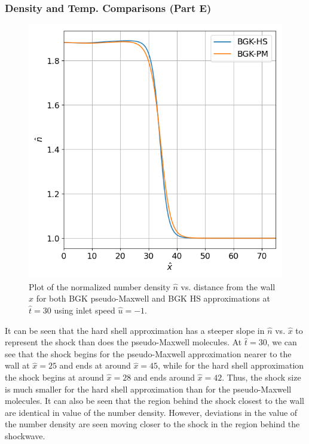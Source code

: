 \documentclass[a4paper]{article}
\begin{document}
\subsubsection{Density and Temp. Comparisons (Part E)}
\begin{figure}[hbt!]
    \centering
    \includegraphics[width=14cm]{plots/problem_e_n.png}
    \caption{\centering Plot of the normalized number density $\hat{n}$ vs. distance from the wall $\hat{x}$ for both BGK pseudo-Maxwell and BGK HS approximations at $\hat{t} = 30$ using inlet speed $\hat{u} = -1$.}
    \label{problem_e_n}
\end{figure}
It can be seen that the hard shell approximation has a steeper slope in $\hat{n}$ vs. $\hat{x}$ to represent the shock than does the pseudo-Maxwell molecules. At $\hat{t} = 30$, we can see that the shock begins for the pseudo-Maxwell approximation nearer to the wall at $\hat{x} = 25$ and ends at around $\hat{x} = 45$, while for the hard shell approximation the shock begins at around $\hat{x} = 28$ and ends around $\hat{x} = 42$. Thus, the shock size is much smaller for the hard shell approximation than for the pseudo-Maxwell molecules. It can also be seen that the region behind the shock closest to the wall are identical in value of the number density. However, deviations in the value of the number density are seen moving closer to the shock in the region behind the shockwave. 
\end{document}
